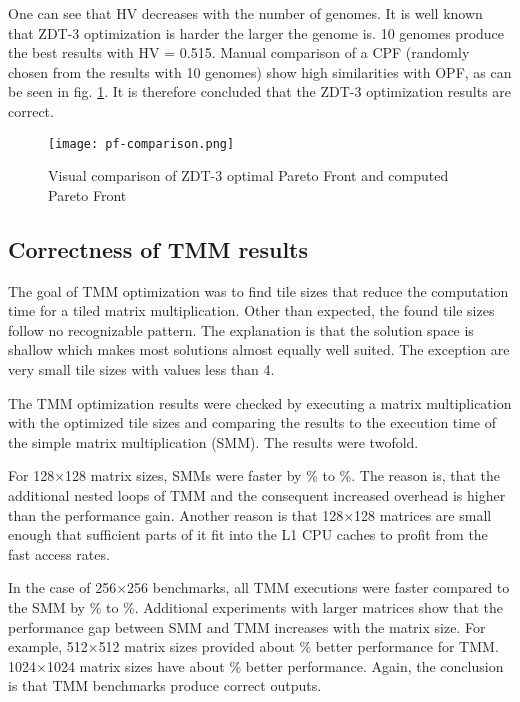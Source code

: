 One can see that HV decreases with the number of genomes. It is well known that ZDT-3 optimization is harder the larger the genome is. 10 genomes produce the best results with HV = 0.515. Manual comparison of a CPF (randomly chosen from the results with 10 genomes) show high similarities with OPF, as can be seen in fig. \ref{fig:pf-comparison}. It is therefore concluded that the ZDT-3 optimization results are correct.

\begin{figure}
  \centering
  \texttt{[image: pf-comparison.png]}
  \caption[Comparison of optimal and computed PF for ZDT-3]{Visual comparison of ZDT-3 optimal Pareto Front and computed Pareto Front}
  \label{fig:pf-comparison}
\end{figure}

\subsection{Correctness of TMM results}
The goal of TMM optimization was to find tile sizes that reduce the computation time for a tiled matrix multiplication. Other than expected, the found tile sizes follow no recognizable pattern. The explanation is that the solution space is shallow which makes most solutions almost equally well suited. The exception are very small tile sizes with values less than 4.

The TMM optimization results were checked by executing a matrix multiplication with the optimized tile sizes and comparing the results to the execution time of the simple matrix multiplication (SMM). The results were twofold.

For 128$\times$128 matrix sizes, SMMs were faster by \unit[10]{\%} to \unit[15]{\%}. The reason is, that the additional nested loops of TMM and the consequent increased overhead is higher than the performance gain. Another reason is that 128$\times$128 matrices are small enough that sufficient parts of it fit into the L1 CPU caches to profit from the fast access rates.

In the case of 256$\times$256 benchmarks, all TMM executions were faster compared to the SMM by \unit[20]{\%} to \unit[30]{\%}. Additional experiments with larger matrices show that the performance gap between SMM and TMM increases with the matrix size. For example, 512$\times$512 matrix sizes provided about \unit[50]{\%} better performance for TMM. 1024$\times$1024 matrix sizes have about \unit[400]{\%} better performance. Again, the conclusion is that TMM benchmarks produce correct outputs.

